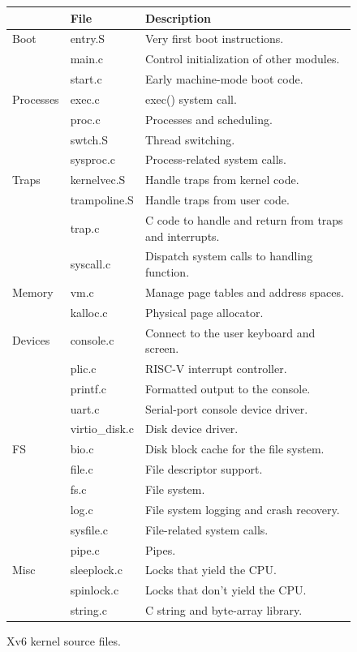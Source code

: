 \begin{figure}[t]
\center
\begin{tabular}{l|l|l}
& {\bf File} & {\bf Description} \\
\midrule
Boot & entry.S & Very first boot instructions. \\
 & main.c & Control initialization of other modules. \\
 & start.c & Early machine-mode boot code. \\
Processes & exec.c & exec() system call. \\
 & proc.c & Processes and scheduling. \\
 & swtch.S & Thread switching. \\
 & sysproc.c & Process-related system calls. \\
Traps & kernelvec.S & Handle traps from kernel code. \\
 & trampoline.S & Handle traps from user code. \\
 & trap.c & C code to handle and return from traps and interrupts. \\
 & syscall.c & Dispatch system calls to handling function. \\
Memory & vm.c & Manage page tables and address spaces. \\
 & kalloc.c & Physical page allocator. \\
Devices & console.c & Connect to the user keyboard and screen. \\
 & plic.c & RISC-V interrupt controller. \\
 & printf.c & Formatted output to the console. \\
 & uart.c & Serial-port console device driver. \\
 & virtio\_disk.c & Disk device driver. \\
FS & bio.c & Disk block cache for the file system. \\
 & file.c & File descriptor support. \\
 & fs.c & File system. \\
 & log.c & File system logging and crash recovery. \\
 & sysfile.c & File-related system calls. \\
 & pipe.c & Pipes. \\
Misc & sleeplock.c & Locks that yield the CPU. \\
 & spinlock.c & Locks that don't yield the CPU. \\
 & string.c & C string and byte-array library. \\
\end{tabular}
\caption{Xv6 kernel source files.}
\label{fig:source}
\end{figure}

